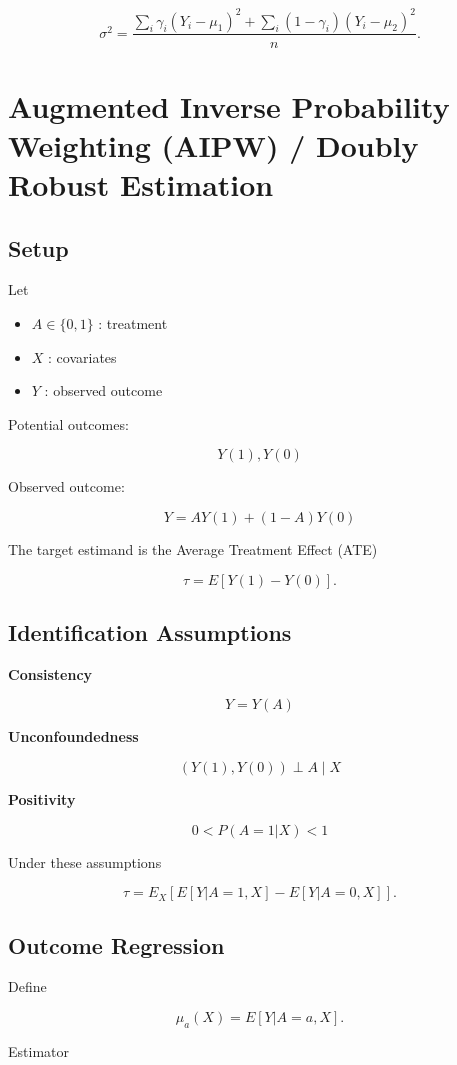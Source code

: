 \documentclass[a4paper,10pt]{article}
\begin{document}
\[
\sigma^2
=
\frac{
\sum_i \gamma_i (Y_i-\mu_1)^2
+
\sum_i (1-\gamma_i)(Y_i-\mu_2)^2
}{n}.
\]

\section{Augmented Inverse Probability Weighting (AIPW) / Doubly Robust Estimation}

\subsection{Setup}

Let

\begin{itemize}
\item $A \in \{0,1\}$ : treatment
\item $X$ : covariates
\item $Y$ : observed outcome
\end{itemize}

Potential outcomes:

\[
Y(1), Y(0)
\]

Observed outcome:

\[
Y = AY(1) + (1-A)Y(0)
\]

The target estimand is the Average Treatment Effect (ATE)

\[
\tau = E[Y(1) - Y(0)].
\]

\subsection{Identification Assumptions}

\textbf{Consistency}

\[
Y = Y(A)
\]

\textbf{Unconfoundedness}

\[
(Y(1),Y(0)) \perp A \mid X
\]

\textbf{Positivity}

\[
0 < P(A=1|X) < 1
\]

Under these assumptions

\[
\tau =
E_X
\left[
E[Y|A=1,X] - E[Y|A=0,X]
\right].
\]

\subsection{Outcome Regression}

Define

\[
\mu_a(X) = E[Y|A=a,X].
\]

Estimator
\end{document}
